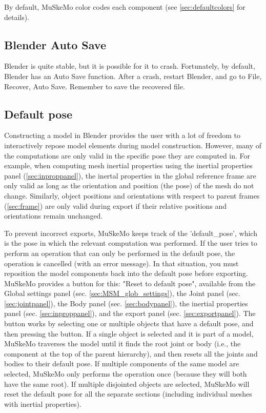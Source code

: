 \documentclass{article}
\begin{document}
By default, MuSkeMo color codes each component (see \ref{sec:defaultcolors} for details).


\subsection{Blender Auto Save}

Blender is quite stable, but it is possible for it to crash. Fortunately, by default, Blender has an Auto Save function. After a crash, restart Blender, and go to File, Recover, Auto Save. Remember to save the recovered file.

\subsection{Default pose}
\label{sec:defaultpose}
Constructing a model in Blender provides the user with a lot of freedom to interactively repose model elements during model construction. However, many of the computations are only valid in the specific pose they are computed in. For example, when computing mesh inertial properties using the inertial properties panel (\ref{sec:inproppanel}), the inertal properties in the global reference frame are only valid as long as the orientation and position (the pose) of the mesh do not change. Similarly, object positions and orientations with respect to parent frames (\ref{sec:frame}) are only valid during export if their relative positions and orientations remain unchanged. 

To prevent incorrect exports, MuSkeMo keeps track of the 'default\_pose', which is the pose in which the relevant computation was performed. If the user tries to perform an operation that can only be performed in the default pose, the operation is cancelled (with an error message). In that situation, you must reposition the model components back into the default pose before exporting. MuSkeMo provides a button for this: "Reset to default pose", available from the Global settings panel (sec. \ref{sec:MSM_glob_settings}), the Joint panel (sec. \ref{sec:jointpanel}), the Body panel (sec. \ref{sec:bodypanel}), the inertial properties panel (sec. \ref{sec:inproppanel}), and the export panel (sec. \ref{sec:exportpanel}). The button works by selecting one or multiple objects that have a default pose, and then pressing the button. If a single object is selected and it is part of a model, MuSkeMo traverses the model until it finds the root joint or body (i.e., the component at the top of the parent hierarchy), and then resets all the joints and bodies to their default pose. If multiple components of the same model are selected, MuSkeMo only performs the operation once (because they will both have the same root). If multiple disjointed objects are selected, MuSkeMo will reset the default pose for all the separate sections (including individual meshes with inertial properties).
\end{document}
